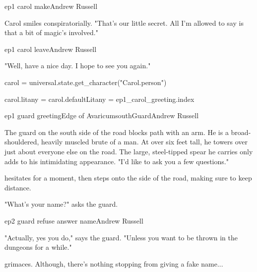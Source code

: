 \documentclass{book}
\begin{document}
\begin{childnode}{ep1 carol make}{Andrew Russell}

    Carol smiles conspiratorially. "That's our little secret. All I'm allowed to say is that a bit of magic's involved."



\end{childnode}

\begin{childnode}{ep1 carol leave}{Andrew Russell}

    "Well, have a nice day. I hope to see you again."

    \begin{code}

        carol = universal.state.get_character("Carol.person")

        carol.litany = carol.defaultLitany = ep1_carol_greeting.index

    \end{code}

\end{childnode}

\begin{node}{ep1 guard greeting}{Edge of Avaricum}{southGuard}{Andrew Russell}

The guard on the south side of the road blocks \names{} path with an arm. 
    He is a broad-shouldered, heavily muscled brute of a man. At over six feet tall, he towers over just about everyone else on the road. The large, steel-tipped
    spear he carries only adds to his intimidating appearance. "I'd like to ask you a few questions."

\name{} hesitates for a moment, then steps onto the side of the road, making sure to keep \hisher{} distance. 

"What's your name?" asks the guard.




\end{node}

\begin{childnode}{ep2 guard refuse answer name}{Andrew Russell}

"Actually, yes you do," says the guard. "Unless you want to be thrown in the dungeons for a while."

\name{} grimaces. Although, there's nothing stopping \himher{} from giving a fake name...



\end{childnode}
\end{document}
